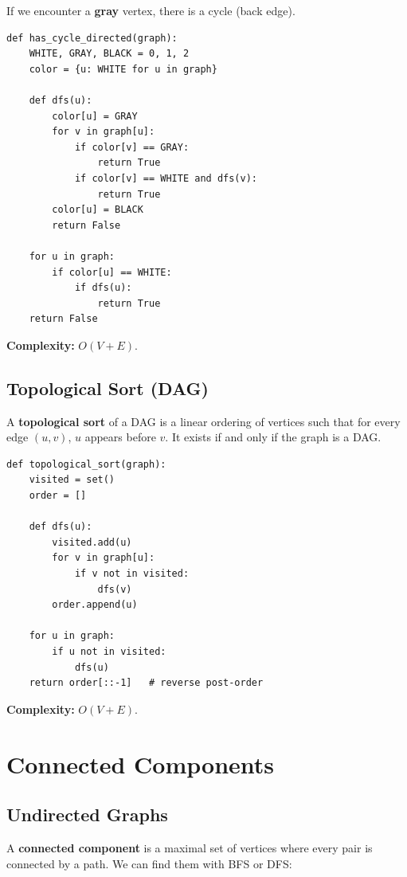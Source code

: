 \documentclass[11pt,a4paper]{article}
\begin{document}
If we encounter a \textbf{gray} vertex, there is a cycle (back edge).

\begin{lstlisting}
def has_cycle_directed(graph):
    WHITE, GRAY, BLACK = 0, 1, 2
    color = {u: WHITE for u in graph}

    def dfs(u):
        color[u] = GRAY
        for v in graph[u]:
            if color[v] == GRAY:
                return True
            if color[v] == WHITE and dfs(v):
                return True
        color[u] = BLACK
        return False

    for u in graph:
        if color[u] == WHITE:
            if dfs(u):
                return True
    return False
\end{lstlisting}

\textbf{Complexity:} $O(V + E)$.

\subsection{Topological Sort (DAG)}

A \textbf{topological sort} of a DAG is a linear ordering of vertices such that for every edge $(u, v)$, $u$ appears before $v$. It exists if and only if the graph is a DAG.

\begin{lstlisting}
def topological_sort(graph):
    visited = set()
    order = []

    def dfs(u):
        visited.add(u)
        for v in graph[u]:
            if v not in visited:
                dfs(v)
        order.append(u)

    for u in graph:
        if u not in visited:
            dfs(u)
    return order[::-1]   # reverse post-order
\end{lstlisting}

\textbf{Complexity:} $O(V + E)$.

\section{Connected Components}

\subsection{Undirected Graphs}

A \textbf{connected component} is a maximal set of vertices where every pair is connected by a path. We can find them with BFS or DFS:
\end{document}
